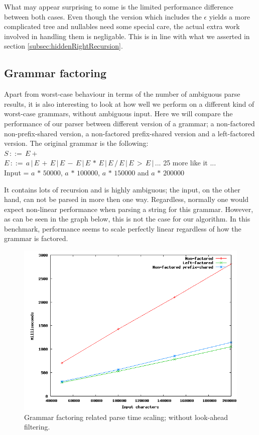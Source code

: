 \documentclass[a4paper,10pt]{article}
\begin{document}
What may appear surprising to some is the limited performance difference between both cases. Even though the version which includes the $\epsilon$ yields a more complicated tree and nullables need some special care, the actual extra work involved in handling them is negligable. This is in line with what we asserted in section \ref{subsec:hiddenRightRecursion}.

\subsection{Grammar factoring}
\label{sec:factoringBenchmark}

Apart from worst-case behaviour in terms of the number of ambiguous parse results, it is also interesting to look at how well we perform on a different kind of worst-case grammars, without ambiguous input. Here we will compare the performance of our parser between different version of a grammar; a non-factored non-prefix-shared version, a non-factored prefix-shared version and a left-factored version. The original grammar is the following:\\
$S\,::=\,E+$\\
$E\,::=\,a\,|\,E\,+\,E\,|\,E\,-\,E\,|\,E\,*\,E\,|\,E\,/\,E\,|\,E\,>\,E\,|\,...$ 25 more like it ...\\
Input = $a\,*\,50000$, $a\,*\,100000$, $a\,*\,150000$ and $a\,*\,200000$

It contains lots of recursion and is highly ambiguous; the input, on the other hand, can not be parsed in more then one way. Regardless, normally one would expect non-linear performance when parsing a string for this grammar. However, as can be seen in the graph below, this is not the case for our algorithm. In this benchmark, performance seems to scale perfectly linear regardless of how the grammar is factored.

\begin{figure}[H]
\centering
\includegraphics[scale=0.55]{grammar-factoring.png}
\caption{Grammar factoring related parse time scaling; without look-ahead filtering.}
\end{figure}
\end{document}
